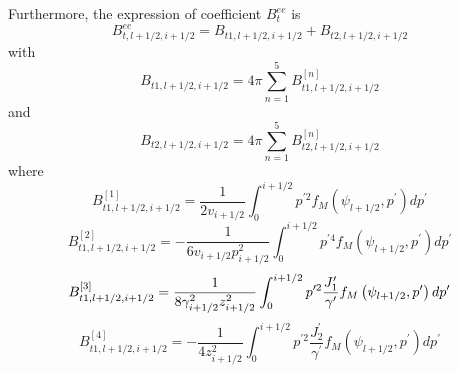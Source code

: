 Furthermore, the expression of coefficient $B_{t}^{ee}$ is
\begin{equation}
B_{t,l+1/2,i+1/2}^{ee}=B_{t1,l+1/2,i+1/2}+B_{t2,l+1/2,i+1/2}
\end{equation}
with
\begin{equation}
B_{t1,l+1/2,i+1/2}=4\pi \sum_{n=1}^{5}B_{t1,l+1/2,i+1/2}^{\left[ n\right] }
\end{equation}
and
\begin{equation}
B_{t2,l+1/2,i+1/2}=4\pi \sum_{n=1}^{5}B_{t2,l+1/2,i+1/2}^{\left[ n\right] }
\end{equation}
where
\begin{equation}
B_{t1,l+1/2,i+1/2}^{\left[ 1\right] }=\frac{1}{2v_{i+1/2}}%
\int_{0}^{i+1/2}p^{\prime 2}f_{M}\left( \psi _{l+1/2},p^{\prime }\right)
dp^{\prime }
\end{equation}
\begin{equation}
B_{t1,l+1/2,i+1/2}^{\left[ 2\right] }=-\frac{1}{6v_{i+1/2}p_{i+1/2}^{2}}%
\int_{0}^{i+1/2}p^{\prime 4}f_{M}\left( \psi _{l+1/2},p^{\prime }\right)
dp^{\prime }
\end{equation}
\begin{equation}
B_{t1,l+1/2,i+1/2}^{\left[ 3\right] }=\frac{1}{8\gamma
_{i+1/2}^{2}z_{i+1/2}^{2}}\int_{0}^{i+1/2}p^{\prime 2}\frac{J_{1}^{\prime }}{%
\gamma ^{\prime }}f_{M}\left( \psi _{l+1/2},p^{\prime }\right) dp^{\prime }
\end{equation}
\begin{equation}
B_{t1,l+1/2,i+1/2}^{\left[ 4\right] }=-\frac{1}{4z_{i+1/2}^{2}}%
\int_{0}^{i+1/2}p^{\prime 2}\frac{J_{2}^{\prime }}{\gamma ^{\prime }}%
f_{M}\left( \psi _{l+1/2},p^{\prime }\right) dp^{\prime }
\end{equation}

